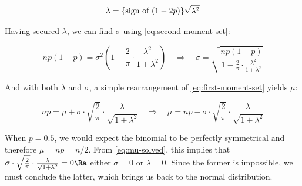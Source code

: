 \documentclass{article}
\begin{document}
\begin{equation}
  \label{eq:lambda-solved}
  \lambda = \textnormal{\{sign of $(1-2p)$\}} \sqrt{\lambda^2}
\end{equation}


Having secured $\lambda$, we can find $\sigma$ using
\eqref{eq:second-moment-set}:

\begin{equation}
  \label{eq:sigma-solved}
  np(1-p) = \sigma^2 \left( 1 - \frac{2}{\pi} \cdot \frac{\lambda^2}{1 + \lambda^2} \right) \quad\Rightarrow\quad
  \sigma = \sqrt{\frac{np(1-p)}{1 - \frac{2}{\pi} \cdot \frac{\lambda^2}{1 + \lambda^2}}}
\end{equation}

And with both $\lambda$ and $\sigma$, a simple rearrangement of
\eqref{eq:first-moment-set} yields $\mu$:

\begin{equation}
  \label{eq:mu-solved}
  np = \mu + \sigma \cdot \sqrt{\frac{2}{\pi}} \cdot \frac{\lambda}{\sqrt{1 + \lambda^2}} \quad\Rightarrow\quad
  \mu = np - \sigma \cdot \sqrt{\frac{2}{\pi}} \cdot \frac{\lambda}{\sqrt{1 + \lambda^2}}
\end{equation}

When $p = 0.5$, we would expect the binomial to be perfectly symmetrical and
therefore $\mu = np = n/2$. From \eqref{eq:mu-solved}, this implies that
$\sigma \cdot \sqrt{\frac{2}{\pi}} \cdot \frac{\lambda}{\sqrt{1 + \lambda^2}} =
0 \Ra$ either $\sigma = 0$ or $\lambda = 0$. Since the former is impossible, we
must conclude the latter, which brings us back to the normal distribution.

\end{document}
